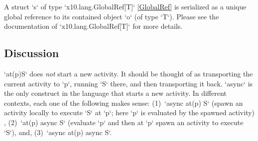 A struct \xcd`s` of type \xcd`x10.lang.GlobalRef[T]` \ref{GlobalRef}
is serialized as a unique global reference to its contained object
\xcd`o` (of type \xcd`T`).  Please see the documentation
of \xcd`x10.lang.GlobalRef[T]` for more details.







\subsection{Discussion}
\xcd`at(p)S` does {\em not} start a new activity.  It should be thought of as
transporting the current activity to \xcd`p`, running \xcd`S` there, and then
transporting it back.  \xcd`async` is the only construct in the
language that starts a new activity. In different contexts, each one
of the following makes sense:
(1)~\xcd`async at(p) S` (spawn an activity locally to execute \xcd`S` at
\xcd`p`; here \xcd`p` is evaluated by the spawned activity) , 
(2)~\xcd`at(p) async S` (evaluate \xcd`p` and then at \xcd`p` spawn an
activity to execute \xcd`S`), and,
(3)~\xcd`async at(p) async S`. 

